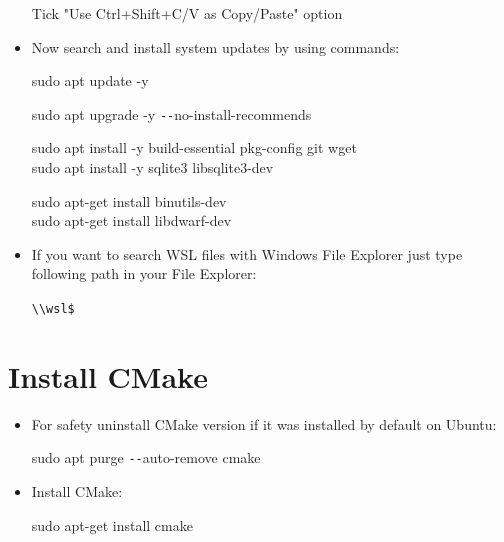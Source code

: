 \documentclass[a4paper,12pt]{book}
\begin{document}
\begin{itemize}
\begin{minipage}[t]{\linewidth}
		\medskip
		Tick "Use Ctrl+Shift+C/V as Copy/Paste" option
	\end{minipage}
	\item Now search and install system updates by using commands:
	
	\vspace{3mm}
	sudo apt update -y
	
	\vspace{0.05mm}
	sudo apt upgrade -y \texttt{-{}-}no-install-recommends
	
	
	sudo apt install -y build-essential pkg-config git wget \\
	sudo apt install -y sqlite3 libsqlite3-dev
	\vspace{3mm}
	
	sudo apt-get install binutils-dev \\
	sudo apt-get install libdwarf-dev
	\item If you want to search WSL files with Windows File Explorer just type following path in your File Explorer:
	
	\vspace{3mm}
	\verb*|\\wsl$|
\end{itemize}
\section{Install CMake}
\begin{itemize}
	\item For safety uninstall CMake version if it was installed by default on Ubuntu:
	
	\vspace{3mm}
	sudo apt purge \texttt{-{}-}auto-remove cmake
	\vspace{3mm}
	
	\item Install CMake:
	
	\vspace{3mm}
	sudo apt-get install cmake
	\vspace{3mm}
\end{itemize}
\end{document}
